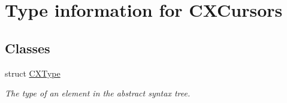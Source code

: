 \hypertarget{group__CINDEX__TYPES}{}\section{Type information for C\+X\+Cursors}
\label{group__CINDEX__TYPES}
\subsection*{Classes}
\begin{DoxyCompactItemize}
\item 
struct \mbox{\hyperlink{structCXType}{C\+X\+Type}}
\begin{DoxyCompactList}\small\item\em The type of an element in the abstract syntax tree. \end{DoxyCompactList}\end{DoxyCompactItemize}
